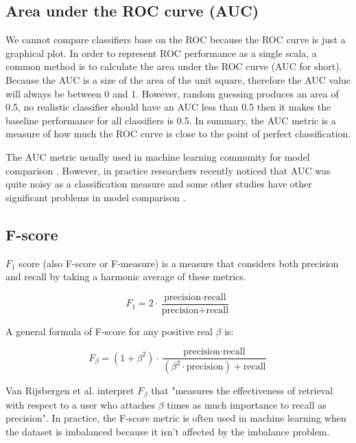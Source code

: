 \subsection*{Area under the ROC curve (AUC)}

We cannot compare classifiers base on the ROC because the ROC curve is just a graphical plot. In order to represent ROC performance as a single scala, a common method is to calculate the area under the ROC curve (AUC for short). Because the AUC is a size of the area of the unit square, therefore the AUC value will always be between 0 and 1. However, random guessing produces an area of 0.5, no realistic classifier should have an AUC less than 0.5 then it makes the baseline performance for all classifiers is 0.5. In summary, the AUC metric is a measure of how much the ROC curve is close to the point of perfect classification.

The AUC metric usually used in machine learning community for model comparison \citep{hanley1983method}. However, in practice researchers recently noticed that AUC was quite noisy as a classification measure \citep{hanczar2010small} and some other studies have other significant problems in model comparison \citep{lobo2008auc, hand2009measuring}.

\subsection*{F-score}

$F_1$ score (also F-score or F-measure) is a measure that considers both precision and recall by taking a harmonic average of these metrics.


\begin{equation}
F_1 = 2 \cdot \dfrac{ \text{precision} \cdot \text{recall} }{ \text{precision} + \text{recall} }
\end{equation}


A general formula of F-score for any positive real $\beta$ is:


\begin{equation}
F_\beta = (1 + \beta^2) \cdot \dfrac{ \text{precision} \cdot \text{recall} }{ (\beta^2 \cdot \text{precision}) + \text{recall} }
\end{equation}


Van Rijsbergen et al. \citep{van1979information} interpret $F_\beta$ that "measures the effectiveness of retrieval with respect to a user who attaches $\beta$ times as much importance to recall as precision". In practice, the F-score metric is often used in machine learning when the dataset is imbalanced because it isn't affected by the imbalance problem.